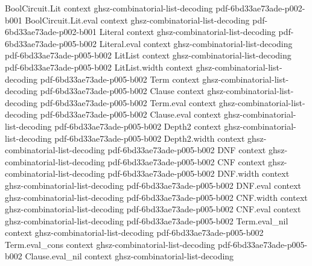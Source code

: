 \begin{lemma}
\label{BooleanAnalysis.sum_chiS_mul_eq}
\leanok
{}
\proofstep
  {BoolCircuit.Lit}
  {context}
  {ghsz-combinatorial-list-decoding}
  {pdf-6bd33ae73ade-p002-b001}
\proofstep
  {BoolCircuit.Lit.eval}
  {context}
  {ghsz-combinatorial-list-decoding}
  {pdf-6bd33ae73ade-p002-b001}
\proofstep
  {Literal}
  {context}
  {ghsz-combinatorial-list-decoding}
  {pdf-6bd33ae73ade-p005-b002}
\proofstep
  {Literal.eval}
  {context}
  {ghsz-combinatorial-list-decoding}
  {pdf-6bd33ae73ade-p005-b002}
\proofstep
  {LitList}
  {context}
  {ghsz-combinatorial-list-decoding}
  {pdf-6bd33ae73ade-p005-b002}
\proofstep
  {LitList.width}
  {context}
  {ghsz-combinatorial-list-decoding}
  {pdf-6bd33ae73ade-p005-b002}
\proofstep
  {Term}
  {context}
  {ghsz-combinatorial-list-decoding}
  {pdf-6bd33ae73ade-p005-b002}
\proofstep
  {Clause}
  {context}
  {ghsz-combinatorial-list-decoding}
  {pdf-6bd33ae73ade-p005-b002}
\proofstep
  {Term.eval}
  {context}
  {ghsz-combinatorial-list-decoding}
  {pdf-6bd33ae73ade-p005-b002}
\proofstep
  {Clause.eval}
  {context}
  {ghsz-combinatorial-list-decoding}
  {pdf-6bd33ae73ade-p005-b002}
\proofstep
  {Depth2}
  {context}
  {ghsz-combinatorial-list-decoding}
  {pdf-6bd33ae73ade-p005-b002}
\proofstep
  {Depth2.width}
  {context}
  {ghsz-combinatorial-list-decoding}
  {pdf-6bd33ae73ade-p005-b002}
\proofstep
  {DNF}
  {context}
  {ghsz-combinatorial-list-decoding}
  {pdf-6bd33ae73ade-p005-b002}
\proofstep
  {CNF}
  {context}
  {ghsz-combinatorial-list-decoding}
  {pdf-6bd33ae73ade-p005-b002}
\proofstep
  {DNF.width}
  {context}
  {ghsz-combinatorial-list-decoding}
  {pdf-6bd33ae73ade-p005-b002}
\proofstep
  {DNF.eval}
  {context}
  {ghsz-combinatorial-list-decoding}
  {pdf-6bd33ae73ade-p005-b002}
\proofstep
  {CNF.width}
  {context}
  {ghsz-combinatorial-list-decoding}
  {pdf-6bd33ae73ade-p005-b002}
\proofstep
  {CNF.eval}
  {context}
  {ghsz-combinatorial-list-decoding}
  {pdf-6bd33ae73ade-p005-b002}
\proofstep
  {Term.eval_nil}
  {context}
  {ghsz-combinatorial-list-decoding}
  {pdf-6bd33ae73ade-p005-b002}
\proofstep
  {Term.eval_cons}
  {context}
  {ghsz-combinatorial-list-decoding}
  {pdf-6bd33ae73ade-p005-b002}
\proofstep
  {Clause.eval_nil}
  {context}
  {ghsz-combinatorial-list-decoding}

\end{lemma}

